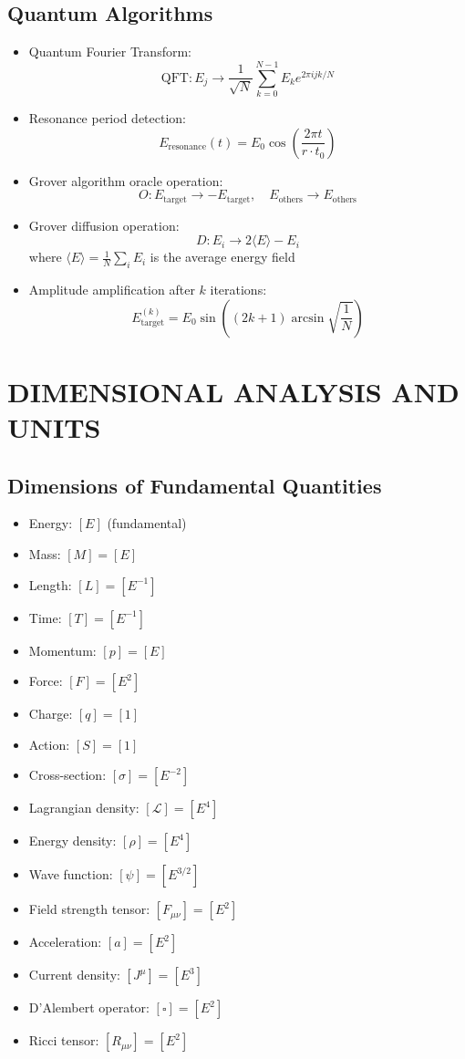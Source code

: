 \documentclass[12pt,a4paper]{article}
\begin{document}
	\subsection{Quantum Algorithms}
	\begin{itemize}
		\item Quantum Fourier Transform:
		$$\text{QFT}: E_j \rightarrow \frac{1}{\sqrt{N}} \sum_{k=0}^{N-1} E_k e^{2\pi i jk/N}$$
		
		\item Resonance period detection:
		$$E_{\text{resonance}}(t) = E_0 \cos\left(\frac{2\pi t}{r \cdot t_0}\right)$$
		
		\item Grover algorithm oracle operation:
		$$O: E_{\text{target}} \rightarrow -E_{\text{target}}, \quad E_{\text{others}} \rightarrow E_{\text{others}}$$
		
		\item Grover diffusion operation:
		$$D: E_i \rightarrow 2\langle E \rangle - E_i$$
		where $\langle E \rangle = \frac{1}{N}\sum_i E_i$ is the average energy field
		
		\item Amplitude amplification after $k$ iterations:
		$$E_{\text{target}}^{(k)} = E_0 \sin\left((2k+1)\arcsin\sqrt{\frac{1}{N}}\right)$$
	\end{itemize}
	

	\section{DIMENSIONAL ANALYSIS AND UNITS}
	
	\subsection{Dimensions of Fundamental Quantities}
	\begin{itemize}
		\item Energy: $[E]$ (fundamental)
		\item Mass: $[M] = [E]$
		\item Length: $[L] = [E^{-1}]$
		\item Time: $[T] = [E^{-1}]$
		\item Momentum: $[p] = [E]$
		\item Force: $[F] = [E^2]$
		\item Charge: $[q] = [1]$
		\item Action: $[S] = [1]$
		\item Cross-section: $[\sigma] = [E^{-2}]$
		\item Lagrangian density: $[\mathcal{L}] = [E^4]$
		\item Energy density: $[\rho] = [E^4]$
		\item Wave function: $[\psi] = [E^{3/2}]$
		\item Field strength tensor: $[F_{\mu\nu}] = [E^2]$
		\item Acceleration: $[a] = [E^2]$
		\item Current density: $[J^\mu] = [E^3]$
		\item D'Alembert operator: $[\square] = [E^2]$
		\item Ricci tensor: $[R_{\mu\nu}] = [E^2]$
	\end{itemize}
	
\end{document}

